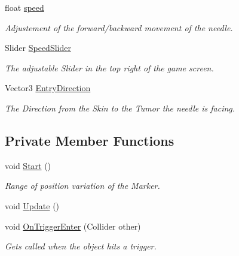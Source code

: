 \begin{DoxyCompactItemize}
\mbox{\label{class_needle_placement_a4cd592ecc15d8cbdf2ce7acb03304ed9}} 
float \mbox{\hyperlink{class_needle_placement_a4cd592ecc15d8cbdf2ce7acb03304ed9}{speed}}
\begin{DoxyCompactList}\small\item\em Adjustement of the forward/backward movement of the needle. \end{DoxyCompactList}\item 
\mbox{\label{class_needle_placement_ad5bd8d475f32a2ad703acfb321f39932}} 
Slider \mbox{\hyperlink{class_needle_placement_ad5bd8d475f32a2ad703acfb321f39932}{Speed\+Slider}}
\begin{DoxyCompactList}\small\item\em The adjustable Slider in the top right of the game screen. \end{DoxyCompactList}\item 
\mbox{\label{class_needle_placement_aae529bd91f416f60c95f465e19e7445a}} 
Vector3 \mbox{\hyperlink{class_needle_placement_aae529bd91f416f60c95f465e19e7445a}{Entry\+Direction}}
\begin{DoxyCompactList}\small\item\em The Direction from the Skin to the Tumor the needle is facing. \end{DoxyCompactList}\end{DoxyCompactItemize}
\subsection*{Private Member Functions}
\begin{DoxyCompactItemize}
\item 
void \mbox{\hyperlink{class_needle_placement_ae55a927284439c04bf27f75bec13b587}{Start}} ()
\begin{DoxyCompactList}\small\item\em Range of position variation of the Marker. \end{DoxyCompactList}\item 
void \mbox{\hyperlink{class_needle_placement_aa41fc424e416e7bfff4ff32a0a95acc1}{Update}} ()
\item 
\mbox{\label{class_needle_placement_aaf954884073c3f9fd9f13641aa0400cf}} 
void \mbox{\hyperlink{class_needle_placement_aaf954884073c3f9fd9f13641aa0400cf}{On\+Trigger\+Enter}} (Collider other)
\begin{DoxyCompactList}\small\item\em Gets called when the object hits a trigger. \end{DoxyCompactList}\end{DoxyCompactItemize}



